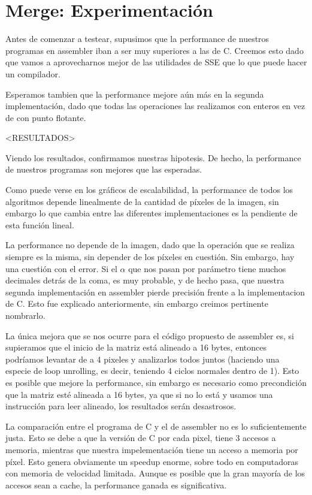 \section{Merge: Experimentación}

Antes de comenzar a testear, supusimos que la performance de nuestros programas en assembler iban a ser muy superiores a las de C. Creemos esto dado que vamos a aprovecharnos mejor de las utilidades de SSE que lo que puede hacer un compilador. 

Esperamos tambien que la performance mejore aún más en la segunda implementación, dado que todas las operaciones las realizamos con enteros en vez de con punto flotante.



<RESULTADOS>



Viendo los resultados, confirmamos nuestras hipotesis. De hecho, la performance de nuestros programas son mejores que las esperadas.

Como puede verse en los gráficos de escalabilidad, la performance de todos los algoritmos depende linealmente de la cantidad de píxeles de la imagen, sin embargo lo que cambia entre las diferentes implementaciones es la pendiente de esta función lineal.

La performance no depende de la imagen, dado que la operación que se realiza siempre es la misma, sin depender de los píxeles en cuestión.
Sin embargo, hay una cuestión con el error. Si el $\alpha$ que nos pasan por parámetro tiene muchos decimales detrás de la coma, es muy probable, y de hecho pasa, que nuestra segunda implementación en assembler pierde precisión frente a la implementacion de C. Esto fue explicado anteriormente, sin embargo creimos pertinente nombrarlo.

La única mejora que se nos ocurre para el código propuesto de assembler es, si supieramos que el inicio de la matriz está alineado a 16 bytes, entonces podríamos levantar de a 4 pixeles y analizarlos todos juntos (haciendo una especie de loop unrolling, es decir, teniendo 4 ciclos normales dentro de 1).
Esto es posible que mejore la performance, sin embargo es necesario como precondición que la matriz esté alineada a 16 bytes, ya que si no lo está y usamos una instrucción para leer alineado, los resultados serán desastrosos.

La comparación entre el programa de C y el de assembler no es lo suficientemente justa. Esto se debe a que la versión de C por cada pixel, tiene 3 accesos a memoria, mientras que nuestra impelementación tiene un acceso a memoria por píxel. Esto genera obviamente un speedup enorme, sobre todo en computadoras con memoria de velocidad limitada.
Aunque es posible que la gran mayoría de los accesos sean a cache, la performance ganada es significativa.

